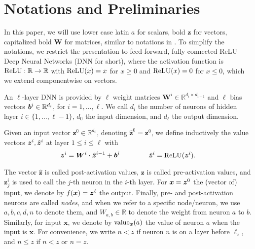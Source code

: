 \section{Notations and Preliminaries}
	
	In this paper, we will use lower case latin $a$ for scalars, bold $\boldsymbol{z}$ for vectors, 
	capitalized bold $\boldsymbol{W}$ for matrices, similar to notations in \cite{crown}.
	To simplify the notations, we restrict the presentation to feed-forward, 
	fully connected ReLU Deep Neural Networks (DNN for short), where the activation function is $\mathrm{ReLU} : \mathbb{R} \rightarrow \mathbb{R}$ with
	$\mathrm{ReLU}(x)=x$ for $x \geq 0$ and $\mathrm{ReLU}(x)=0$ for $x \leq 0$, which we extend componentwise on vectors.
	
	
	
	
	An $\ell$-layer DNN is provided by $\ell$ weight matrices 
	$\boldsymbol{W}^i \in \mathbb{R}^{d_i\times d_{i-1}}$
	and $\ell$ bias vectors ${\bm{b}}^i \in \mathbb{R}^{d_i}$, for $i=1, \ldots, \ell$.
	We call $d_i$ the number of neurons of hidden layer 
	$i \in \{1, \ldots, \ell-1\}$,
	$d_0$ the input dimension, and $d_\ell$ the output dimension.
	
	Given an input vector $\boldsymbol{z}^0 \in \mathbb{R}^{d_0}$, 
	denoting $\hat{\boldsymbol{z}}^{0}={\boldsymbol{z}}^0$, we define inductively the value vectors $\boldsymbol{z}^i,\hat{{\bm{z}}}^i$ at layer $1 \leq i \leq \ell$ with
	\begin{align*}
		\boldsymbol{z}^{i} = \boldsymbol{W}^i\cdot \hat{\boldsymbol{z}}^{i-1}+ {\bm{b}}^i \qquad \, \qquad
		\hat{\boldsymbol{z}}^{i} = \mathrm{ReLU}({\boldsymbol{z}}^i).
	\end{align*} 
	
	The vector $\hat{\boldsymbol{z}}$ is called post-activation values, 
	$\boldsymbol{z}$ is called pre-activation values, 
	and $\boldsymbol{z}^{i}_j$ is used to call the $j$-th neuron in the $i$-th layer. 
	For $\boldsymbol{x}={\bm{z}}^0$ the (vector of) input, we denote by $f(\boldsymbol{x})={\bm{z}}^\ell$ the output. Finally, pre- and post-activation neurons are called \emph{nodes}, and when we refer to a specific node/neuron, we use $a,b,c,d,n$ to denote them, and $W_{a,b} \in \mathbb{R}$ to denote the weight from neuron $a$ to $b$. Similarly, for input $\boldsymbol{x}$, we denote by ${\textrm{value}}_{\boldsymbol{x}}(a)$ the value of neuron $a$ when the input is $\boldsymbol{x}$.	For convenience, we write $n < z$ if neuron $n$ is on a layer before $\ell_z$, and $n \leq z$ if $n< z$ or $n=z$.
	
